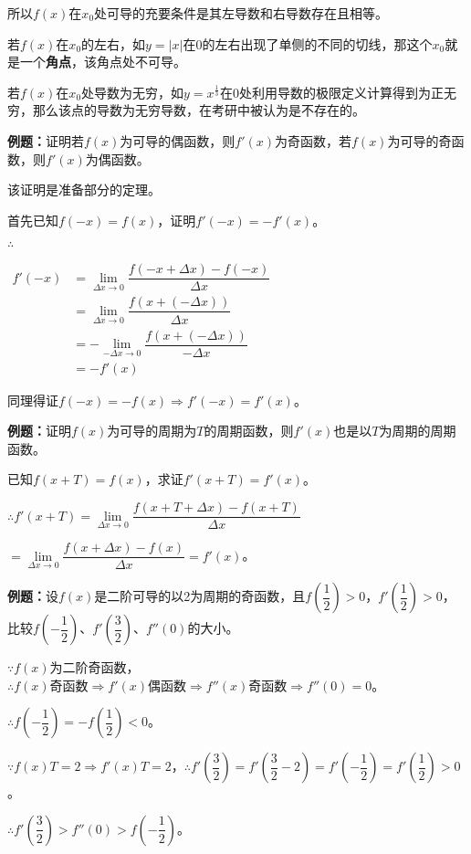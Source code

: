 \documentclass[UTF8, 12pt]{ctexart}
\begin{document}
所以$f(x)$在$x_0$处可导的充要条件是其左导数和右导数存在且相等。

若$f(x)$在$x_0$的左右，如$y=\vert x\vert$在$0$的左右出现了单侧的不同的切线，那这个$x_0$就是一个\textbf{角点}，该角点处不可导。

若$f(x)$在$x_0$处导数为无穷，如$y=x^{\frac{1}{3}}$在$0$处利用导数的极限定义计算得到为正无穷，那么该点的导数为无穷导数，在考研中被认为是不存在的。

\textbf{例题：}证明若$f(x)$为可导的偶函数，则$f'(x)$为奇函数，若$f(x)$为可导的奇函数，则$f'(x)$为偶函数。

该证明是准备部分的定理。

首先已知$f(-x)=f(x)$，证明$f'(-x)=-f'(x)$。

$\therefore$

$
\begin{aligned}
    f'(-x) &=\lim\limits_{\Delta x\to 0}\dfrac{f(-x+\Delta x)-f(-x)}{\Delta x} \\
    & =\lim\limits_{\Delta x\to 0}\dfrac{f(x+(-\Delta x))}{\Delta x} \\
    & =-\lim\limits_{-\Delta x\to 0}\dfrac{f(x+(-\Delta x))}{-\Delta x} \\
    & =-f'(x)
\end{aligned}
$

同理得证$f(-x)=-f(x)\Rightarrow f'(-x)=f'(x)$。

\textbf{例题：}证明$f(x)$为可导的周期为$T$的周期函数，则$f'(x)$也是以$T$为周期的周期函数。

已知$f(x+T)=f(x)$，求证$f'(x+T)=f'(x)$。\medskip

$\therefore f'(x+T)=\lim\limits_{\Delta x\to 0}\dfrac{f(x+T+\Delta x)-f(x+T)}{\Delta x}$

$=\lim\limits_{\Delta x\to 0}\dfrac{f(x+\Delta x)-f(x)}{\Delta x}=f'(x)$。

\textbf{例题：}设$f(x)$是二阶可导的以2为周期的奇函数，且$f(\dfrac{1}{2})>0$，$f'(\dfrac{1}{2})>0$，比较$f(-\dfrac{1}{2})$、$f'(\dfrac{3}{2})$、$f''(0)$的大小。\medskip

$\because f(x)$为二阶奇函数，$\therefore f(x)\text{奇函数}\Rightarrow f'(x)\text{偶函数}\Rightarrow f''(x)\text{奇函数}\Rightarrow f''(0)=0$。

$\therefore f(-\dfrac{1}{2})=-f(\dfrac{1}{2})<0$。

$\because f(x)T=2\Rightarrow f'(x)T=2$，$\therefore f'(\dfrac{3}{2})=f'(\dfrac{3}{2}-2)=f'(-\dfrac{1}{2})=f'(\dfrac{1}{2})>0$。

$\therefore f'(\dfrac{3}{2})>f''(0)>f(-\dfrac{1}{2})$。\medskip
\end{document}
